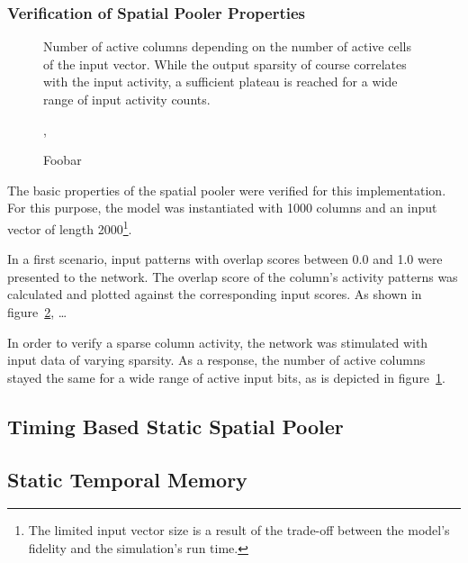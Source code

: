 \subsubsection{Verification of Spatial Pooler Properties}

\begin{figure}
	\begin{center}
		
	\end{center}
	\caption{Number of active columns depending on the number of active cells of the input vector. While the output sparsity of course correlates with the input activity, a sufficient plateau is reached for a wide range of input activity counts.}
	\label{fig:static_spatial_pooler_sparsity}
\end{figure}

\begin{figure}
	\begin{center}
		
	\end{center}
	\caption{Foobar},

	\label{fig:static_spatial_pooler_overlap}
\end{figure}

The basic properties of the spatial pooler were verified for this implementation. For this purpose, the model was instantiated with 1000 columns and an input vector of length 2000\footnote{The limited input vector size is a result of the trade-off between the model's fidelity and the simulation's run time.}.

In a first scenario, input patterns with overlap scores between 0.0 and 1.0 were presented to the network. The overlap score of the column's activity patterns was calculated and plotted against the corresponding input scores. As shown in figure~\ref{fig:static_spatial_pooler_overlap}, …

In order to verify a sparse column activity, the network was stimulated with input data of varying sparsity. As a response, the number of active columns stayed the same for a wide range of active input bits, as is depicted in figure~\ref{fig:static_spatial_pooler_sparsity}.

\subsection{Timing Based Static Spatial Pooler}

\subsection{Static Temporal Memory}

